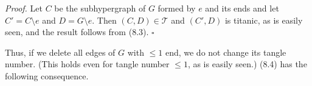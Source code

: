 \textit{Proof.} Let $C$ be the subhypergraph of $G$ formed by $e$ and its ends and let $C' = C \setminus e$ and $D = G \setminus e$. Then $(C, D) \in \mathscr{T}$ and $(C', D)$ is titanic, as is easily seen, and the result follows from (8.3). $\square$

Thus, if we delete all edges of $G$ with $\le 1$ end, we do not change its tangle number. (This holds even for tangle number $\le 1$, as is easily seen.) (8.4) has the following consequence.
